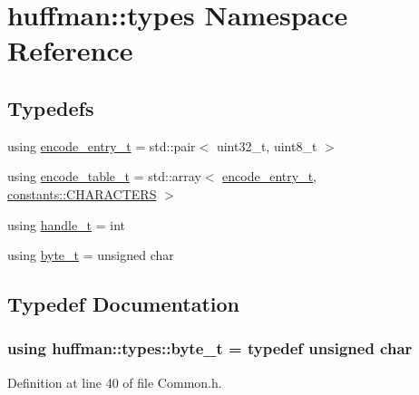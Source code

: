 \hypertarget{namespacehuffman_1_1types}{}\section{huffman\+:\+:types Namespace Reference}
\label{namespacehuffman_1_1types}
\subsection*{Typedefs}
\begin{DoxyCompactItemize}
\item 
using \hyperlink{namespacehuffman_1_1types_a562530b9038f6a3cb2923f1c116a450c}{encode\+\_\+entry\+\_\+t} = std\+::pair$<$ uint32\+\_\+t, uint8\+\_\+t $>$
\item 
using \hyperlink{namespacehuffman_1_1types_a2d111e21190970dfeb935ef0786973c0}{encode\+\_\+table\+\_\+t} = std\+::array$<$ \hyperlink{namespacehuffman_1_1types_a562530b9038f6a3cb2923f1c116a450c}{encode\+\_\+entry\+\_\+t}, \hyperlink{namespacehuffman_1_1constants_a263e0c34ff9ba6afe32efbc1eeabdf88}{constants\+::\+C\+H\+A\+R\+A\+C\+T\+E\+RS} $>$
\item 
using \hyperlink{namespacehuffman_1_1types_a41dc8ca07e19043152b0a5c8b5fec90b}{handle\+\_\+t} = int
\item 
using \hyperlink{namespacehuffman_1_1types_a198fb2bbef1012ab1696124836c56f0d}{byte\+\_\+t} = unsigned char
\end{DoxyCompactItemize}


\subsection{Typedef Documentation}
\subsubsection[{\texorpdfstring{byte\+\_\+t}{byte_t}}]{\setlength{\rightskip}{0pt plus 5cm}using {\bf huffman\+::types\+::byte\+\_\+t} = typedef unsigned char}\hypertarget{namespacehuffman_1_1types_a198fb2bbef1012ab1696124836c56f0d}{}\label{namespacehuffman_1_1types_a198fb2bbef1012ab1696124836c56f0d}


Definition at line 40 of file Common.\+h.

